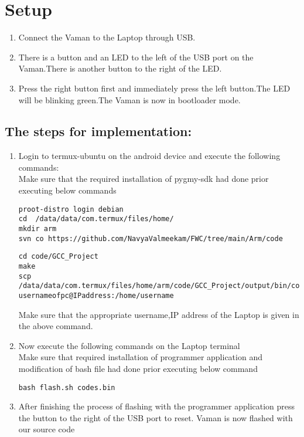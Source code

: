 \documentclass[10pt, a4paper]{article}
\begin{document}
\section{Setup}
\begin{enumerate}
\item Connect the Vaman to the Laptop through USB.
\item There is a button and an LED to the left of the USB port on the Vaman.There is another button to the right of the LED.
\item Press the right button first and immediately press the left button.The LED will be blinking green.The Vaman is now in bootloader mode.
\end{enumerate}
\subsection{The steps for implementation:}
\begin{enumerate}
\item Login to termux-ubuntu on the android device and execute the following commands:\\
Make sure that the required installation of pygmy-sdk had done prior executing below commands
\begin{lstlisting}
proot-distro login debian
cd  /data/data/com.termux/files/home/
mkdir arm
svn co https://github.com/NavyaValmeekam/FWC/tree/main/Arm/code
\end{lstlisting}
\begin{lstlisting}
cd code/GCC_Project
make
scp /data/data/com.termux/files/home/arm/code/GCC_Project/output/bin/codes.bin usernameofpc@IPaddress:/home/username
\end{lstlisting}
Make sure that the appropriate username,IP address of the Laptop is given in the above command.
\item Now execute the following commands on the Laptop terminal\\
Make sure that required installation of programmer application and modification of bash file had done prior executing below command
\begin{lstlisting}
bash flash.sh codes.bin
\end{lstlisting}
\item After finishing the process of flashing with the programmer application press the button to the right of the USB port to reset. Vaman is now flashed with our source code
\end{enumerate}
\end{document}
